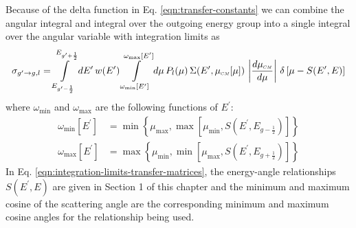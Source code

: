 Because of the delta function in Eq. \eqref{eqn:transfer-constants} we can combine the angular integral and integral over the outgoing energy group into a single integral over the angular variable with integration limits as
\begin{equation}
  \sigma_{g^{\prime}\rightarrow g,l} = \int\limits_{E_{g^{\prime}-\frac{1}{2}}}^{E_{g^{\prime}+\frac{1}{2}}} dE^{\prime} \, w(E^{\prime}) \int\limits_{\omega_{\min}[E^{\prime}]}^{\omega_{\max}[E^{\prime}]} d\mu \, P_l(\mu) \, \Sigma(E^{\prime},\mucm[\mu]) \, \left| \dfrac{d\mucm}{d\mu} \right| \, \delta\left[\mu - S(E^{\prime},E)\right]
\end{equation}
where $\omega_{\min}$ and $\omega_{\max}$ are the following functions of $E^{\prime}$:
\begin{subequations} \label{eqn:integration-limits-transfer-matrices}
  \begin{align}
    \omega_{\min}[E^{\prime}] &= \min\left\lbrace \mu_{\max}, \max\left[\mu_{\min}, S(E^{\prime}, E_{g-\frac{1}{2}})\right]\right\rbrace \\
    \omega_{\max}[E^{\prime}] &= \max\left\lbrace \mu_{\min}, \min\left[\mu_{\max}, S(E^{\prime}, E_{g+\frac{1}{2}})\right]\right\rbrace
  \end{align}
\end{subequations}
In Eq. \eqref{eqn:integration-limits-transfer-matrices}, the energy-angle relationships $S(E^{\prime},E)$ are given in Section 1 of this chapter and the minimum and maximum cosine of the scattering angle are the corresponding minimum and maximum cosine angles for the relationship being used. 